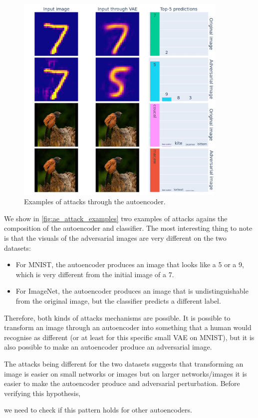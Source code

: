 \documentclass[]{scrarticle}
\renewcommand{\todo}[1]{}
\begin{document}
\begin{figure}[h]
  \centering
  \includegraphics[width=0.9\textwidth]{images/ae_attack_examples.png}
  \caption{
    Examples of attacks through the autoencoder.
  }
  \label{fig:ae_attack_examples}
\end{figure}


We show in \autoref{fig:ae_attack_examples} two examples of attacks
agains the composition of the autoencoder and classifier.
The most interesting thing to note is that the visuals of the
adversarial images are very different on the two datasets:
\begin{itemize}
  \item For MNIST, the autoencoder produces an image that looks like
    a 5 or a 9, which is very different from the initial image of a 7.
  \item For ImageNet, the autoencoder produces an image that is undistinguishable
    from the original image, but the classifier predicts a different label.
\end{itemize}

Therefore, both kinds of attacks mechanisms are possible. It is possible to transform an image through an autoencoder
into something that a human would recognise as different
(or at least for this specific small VAE on MNIST), but it is also possible
to make an autoencoder produce an adversarial image.

The attacks being different for the two datasets suggests that
transforming an image is easier on small networks or images
but on larger networks/images it is easier to make the autoencoder
produce and adversarial perturbation.
Before verifying this hypothesis,
\todo{verify this hypothesis}
we need to check if this pattern holds for other autoencoders.
\end{document}
